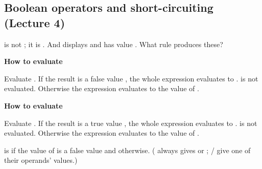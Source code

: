 \documentclass[10pt]{scrartcl}
\newenvironment{howto}[1]{\begin{mdframed}[style=howtostyle]{\color{NavyBlue}\textbf{#1}}\par\vspace{2pt}}{\end{mdframed}}
\begin{document}
\subsection{Boolean operators and short-circuiting (Lecture 4)}
\begin{qbox}
   is not ; it is . And  displays  and has value . What rule produces these?
\end{qbox}
\begin{howto}{How to evaluate }
\begin{steps}
  \ii Evaluate .
  \ii If the result is a false value , the whole expression evaluates to .  is not evaluated.
  \ii Otherwise the expression evaluates to the value of .
\end{steps}
\end{howto}
\begin{howto}{How to evaluate }
\begin{steps}
  \ii Evaluate .
  \ii If the result is a true value , the whole expression evaluates to .  is not evaluated.
  \ii Otherwise the expression evaluates to the value of .
\end{steps}
\end{howto}
 is  if the value of  is a false value and  otherwise. ( always gives  or ; / give one of their operands' values.)
\end{document}
